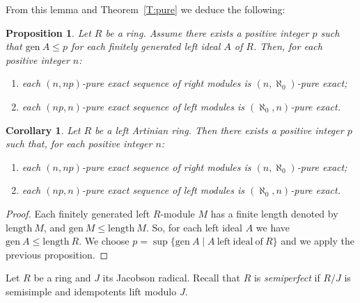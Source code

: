 \documentclass{amsart}
\newtheorem{proposition}[theorem]{Proposition}
\newtheorem{corollary}[theorem]{Corollary}
\begin{document}
From this lemma and Theorem~\ref{T:pure} we deduce the following:
\begin{proposition}
\label{P:genIdeal} Let $R$ be a ring. Assume there exists a positive integer $p$ such that $\mathrm{gen}\ A\leq p$ for each finitely generated left ideal $A$ of $R$. Then, for each positive integer $n$:
\begin{enumerate}
\item each $(n,np)$-pure exact sequence of right modules is $(n,\aleph_0)$-pure exact;
\item each $(np,n)$-pure exact sequence of left modules is $(\aleph_0,n)$-pure exact.
\end{enumerate}
\end{proposition}

\begin{corollary}
\label{C:Artinian} Let $R$ be a left Artinian ring. Then there exists a positive integer $p$ such that, for each positive integer $n$:
\begin{enumerate}
\item each $(n,np)$-pure exact sequence of right modules is $(n,\aleph_0)$-pure exact;
\item each $(np,n)$-pure exact sequence of left modules is $(\aleph_0,n)$-pure exact.
\end{enumerate}
\end{corollary}
\begin{proof}
Each finitely generated left $R$-module $M$ has a finite length  denoted by $\mathrm{length}\ M$, and $\mathrm{gen}\ M\leq\mathrm{length}\ M$. So, for each left ideal $A$ we have $\mathrm{gen}\ A\leq\mathrm{length}\ R$.
We choose $p=\sup\{\mathrm{gen}\ A\mid A\ \mathrm{left\ ideal\ of}\ R\}$  and we apply the previous proposition.
\end{proof}

Let $R$ be a ring and $J$ its Jacobson radical. Recall that $R$ is {\it semiperfect} if $R/J$ is semisimple and idempotents lift modulo $J$.
\end{document}
